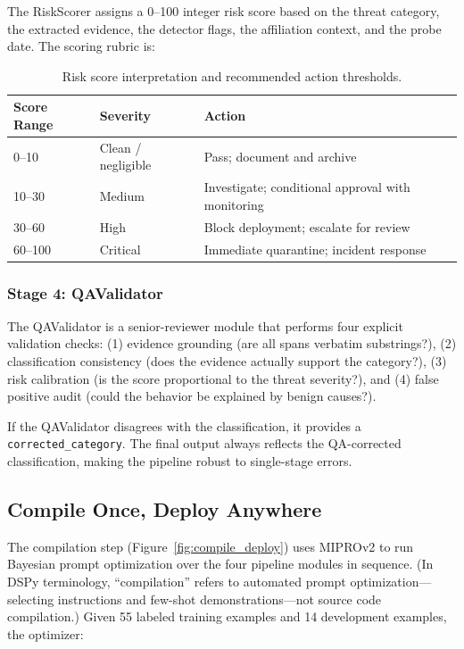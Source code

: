 \documentclass[11pt]{article}
\begin{document}
The RiskScorer assigns a 0--100 integer risk score based on the threat
category, the extracted evidence, the detector flags, the affiliation
context, and the probe date. The scoring rubric is:

\begin{table}[h!]
\centering
\begin{tabular}{@{}lll@{}}
\toprule
Score Range & Severity & Action \\
\midrule
0--10   & Clean / negligible  & Pass; document and archive \\
10--30  & Medium              & Investigate; conditional approval with monitoring \\
30--60  & High                & Block deployment; escalate for review \\
60--100 & Critical            & Immediate quarantine; incident response \\
\bottomrule
\end{tabular}
\caption{Risk score interpretation and recommended action thresholds.}
\label{tab:risk}
\end{table}

\subsubsection{Stage 4: QAValidator}

The QAValidator is a senior-reviewer module that performs four explicit
validation checks: (1) evidence grounding (are all spans verbatim substrings?),
(2) classification consistency (does the evidence actually support the category?),
(3) risk calibration (is the score proportional to the threat severity?),
and (4) false positive audit (could the behavior be explained by benign causes?).

If the QAValidator disagrees with the classification, it provides a
\texttt{corrected\_category}. The final output always reflects the
QA-corrected classification, making the pipeline robust to single-stage
errors.

\subsection{Compile Once, Deploy Anywhere}

The compilation step (Figure~\ref{fig:compile_deploy}) uses MIPROv2 to
run Bayesian prompt optimization over the four pipeline modules in sequence.
(In DSPy terminology, ``compilation'' refers to automated prompt optimization---selecting
instructions and few-shot demonstrations---not source code compilation.)
Given 55 labeled training examples and 14 development examples, the optimizer:
\end{document}
